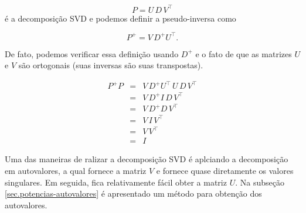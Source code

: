\begin{equation*}
P=U\,D\,V^\top
\end{equation*}
é a decomposição SVD e podemos definir a pseudo-inversa como

\begin{equation*}
P^+=V\,D^+U^\top.
\end{equation*}

De fato, podemos verificar essa definição usando $D^+$ e o fato de que as matrizes $U$ e $V$ são ortogonais (suas inversas são suas transpostas).

\begin{equation*}
\begin{array}{rcl}
P^+P&=&V\,D^+U^\top\,U\,D\,V^\top\\
&=&V\,D^+I\,D\,V^\top\\
&=&V\,D^+D\,V^\top\\
&=&V\,I\,V^\top\\
&=&V\,V^\top\\
&=&I
\end{array}
\end{equation*}

Uma das maneiras de ralizar a decomposição SVD é aplciando a decomposição em autovalores, a qual fornece a matriz $V$ e fornece quase diretamente os valores singulares. Em seguida, fica relativamente fácil obter a matriz $U$. Na subseção \ref{sec.potencias-autovalores} é apresentado um método para obtenção dos autovalores.



